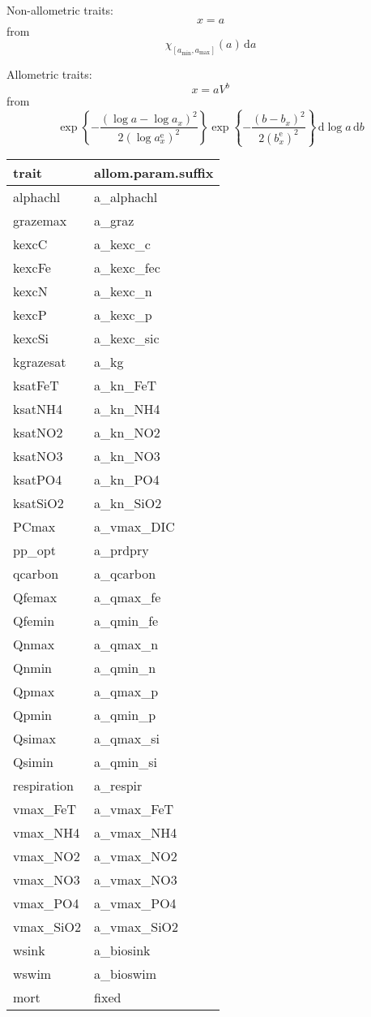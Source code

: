 \documentclass{article}
\def\dd{{\mathrm{d}}}
\def\ee{{\mathrm{e}}}
\begin{document}
Non-allometric traits:
\[
  x = a
\]
from
\[
  \chi_{[a_{\min}, a_{\max}]}(a) \,\dd a
\]

Allometric traits:
\[
  x = a V^{b}
\]
from
\[
  \exp\left\{-\frac{(\log a-\log a_x)^2}{2(\log a_x^\ee)^2}\right\}
  \exp\left\{-\frac{(b-b_x)^2}{2(b_x^\ee)^2}\right\}
  \,\dd\log a \,\dd b
\]
  

\begin{tabular}{ll}
  trait          & allom.param.suffix \\\hline
  alphachl       & a\_alphachl \\
  grazemax       & a\_graz \\
  kexcC          & a\_kexc\_c \\
  kexcFe         & a\_kexc\_fec \\
  kexcN          & a\_kexc\_n \\
  kexcP          & a\_kexc\_p \\
  kexcSi         & a\_kexc\_sic \\
  kgrazesat      & a\_kg \\
  ksatFeT        & a\_kn\_FeT \\
  ksatNH4        & a\_kn\_NH4 \\
  ksatNO2        & a\_kn\_NO2 \\
  ksatNO3        & a\_kn\_NO3 \\
  ksatPO4        & a\_kn\_PO4 \\
  ksatSiO2       & a\_kn\_SiO2 \\
  PCmax          & a\_vmax\_DIC \\
  pp\_opt        & a\_prdpry \\
  qcarbon        & a\_qcarbon \\
  Qfemax         & a\_qmax\_fe \\
  Qfemin         & a\_qmin\_fe \\
  Qnmax          & a\_qmax\_n \\
  Qnmin          & a\_qmin\_n \\
  Qpmax          & a\_qmax\_p \\
  Qpmin          & a\_qmin\_p \\
  Qsimax         & a\_qmax\_si \\
  Qsimin         & a\_qmin\_si \\
  respiration    & a\_respir \\
  vmax\_FeT      & a\_vmax\_FeT \\
  vmax\_NH4      & a\_vmax\_NH4 \\
  vmax\_NO2      & a\_vmax\_NO2 \\
  vmax\_NO3      & a\_vmax\_NO3 \\
  vmax\_PO4      & a\_vmax\_PO4 \\
  vmax\_SiO2     & a\_vmax\_SiO2 \\
  wsink          & a\_biosink \\
  wswim          & a\_bioswim \\
  \hline
  mort           & fixed \\
  \end{tabular}
  
\end{document}
